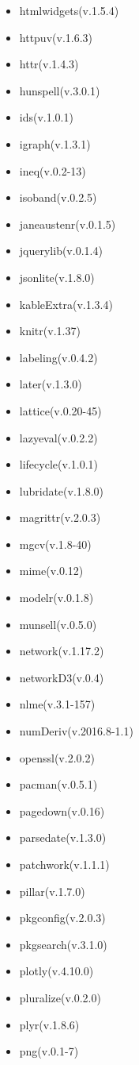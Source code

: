 \documentclass[
]{article}
\begin{document}
\begin{itemize}
\item
  htmlwidgets(v.1.5.4)
\item
  httpuv(v.1.6.3)
\item
  httr(v.1.4.3)
\item
  hunspell(v.3.0.1)
\item
  ids(v.1.0.1)
\item
  igraph(v.1.3.1)
\item
  ineq(v.0.2-13)
\item
  isoband(v.0.2.5)
\item
  janeaustenr(v.0.1.5)
\item
  jquerylib(v.0.1.4)
\item
  jsonlite(v.1.8.0)
\item
  kableExtra(v.1.3.4)
\item
  knitr(v.1.37)
\item
  labeling(v.0.4.2)
\item
  later(v.1.3.0)
\item
  lattice(v.0.20-45)
\item
  lazyeval(v.0.2.2)
\item
  lifecycle(v.1.0.1)
\item
  lubridate(v.1.8.0)
\item
  magrittr(v.2.0.3)
\item
  mgcv(v.1.8-40)
\item
  mime(v.0.12)
\item
  modelr(v.0.1.8)
\item
  munsell(v.0.5.0)
\item
  network(v.1.17.2)
\item
  networkD3(v.0.4)
\item
  nlme(v.3.1-157)
\item
  numDeriv(v.2016.8-1.1)
\item
  openssl(v.2.0.2)
\item
  pacman(v.0.5.1)
\item
  pagedown(v.0.16)
\item
  parsedate(v.1.3.0)
\item
  patchwork(v.1.1.1)
\item
  pillar(v.1.7.0)
\item
  pkgconfig(v.2.0.3)
\item
  pkgsearch(v.3.1.0)
\item
  plotly(v.4.10.0)
\item
  pluralize(v.0.2.0)
\item
  plyr(v.1.8.6)
\item
  png(v.0.1-7)

\end{itemize}
\end{document}
